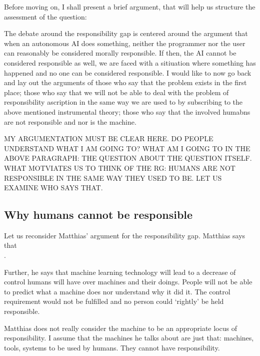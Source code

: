 \documentclass{article}
\begin{document}
Before moving on, I shall present a brief argument, that will help us structure
the assessment of the question:

The debate around the responsibility gap is centered around the argument that
when an autonomous AI does something, neither the programmer nor the user can
reasonably be considered morally responsible. If then, the AI cannot be
considered responsible as well, we are faced with a sitiuation where something
has happened and no one can be considered responsible. I would like to now go
back and lay out the arguments of those who say that the problem exists in the
first place; those who say that we will not be able to deal with the problem of
responsibility ascription in the same way we are used to by subscribing to the
above mentioned instrumental theory; those who say that the involved humabns are
not responsible and nor is the machine. 

MY ARGUMENTATION MUST BE CLEAR HERE. DO PEOPLE UNDERSTAND WHAT I AM GOING TO?
WHAT AM I GOING TO IN THE ABOVE PARAGRAPH: THE QUESTION ABOUT THE QUESTION
ITSELF. WHAT MOTVIATES US TO THINK OF THE RG: HUMANS ARE NOT RESPONSIBLE IN THE
SAME WAY THEY USED TO BE. LET US EXAMINE WHO SAYS THAT.

\subsection{Why humans cannot be responsible}

Let us reconsider Matthias' argument for the responsibility gap. Matthias says
that\\

.

Further, he says that machine learning technology will lead to a decrease of
control humans will have over machines and their doings. People will not be able
to predict what a machine does nor understand why it did it. The control
requirement would not be fulfilled and no person could `rightly' be held
responsible.

Matthias does not really consider the machine to be an appropriate locus of
responsibility. I assume that the machines he talks about are just that:
machines, tools, systems to be used by humans. They cannot have
responsibility.\\
\end{document}
